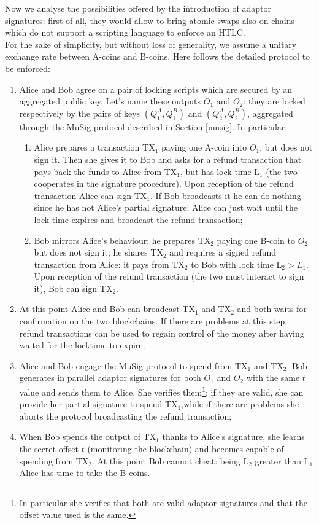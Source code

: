 \bigskip
\noindent
Now we analyse the possibilities offered by the introduction of adaptor signatures: first of all, they would allow to bring atomic swaps also on chains which do not support a scripting language to enforce an HTLC. 
\\
For the sake of simplicity, but without loss of generality, we assume a unitary exchange rate between A-coins and B-coins. Here follows the detailed protocol to be enforced:
\begin{enumerate}
	\item Alice and Bob agree on a pair of locking scripts which are secured by an aggregated public key. Let's name these outputs $O_1$ and $O_2$: they are locked respectively by the pairs of keys $(Q_1^A, Q_1^B)$ and $(Q_2^A, Q_2^B)$, aggregated through the MuSig protocol described in Section \ref{musig}. In particular:
	\begin{enumerate}
		\item Alice prepares a transaction TX$_1$ paying one A-coin into $O_1$, but does not sign it. Then she gives it to Bob and asks for a refund transaction that pays back the funds to Alice from TX$_1$, but has lock time L$_1$ (the two cooperates in the signature procedure). Upon reception of the refund transaction Alice can sign TX$_1$. If Bob broadcasts it he can do nothing since he has not Alice's partial signature; Alice can just wait until the lock time expires and broadcast the refund transaction;
		\item Bob mirrors Alice's behaviour: he prepares TX$_2$ paying one B-coin to $O_2$ but does not sign it; he shares TX$_2$ and requires a signed refund transaction from Alice: it pays from TX$_2$ to Bob with lock time L$_2 > L_1$. Upon reception of the refund transaction (the two must interact to sign it), Bob can sign TX$_2$.
	\end{enumerate}
	\item At this point Alice and Bob can broadcast TX$_1$ and TX$_2$ and both waits for confirmation on the two blockchains. If there are problems at this step, refund transactions can be used to regain control of the money after having waited for the locktime to expire;
	\item Alice and Bob engage the MuSig protocol to spend from TX$_1$ and TX$_2$. Bob generates in parallel adaptor signatures for both $O_1$ and $O_2$ with the same $t$ value and sends them to Alice. She verifies them\footnote{In particular she verifies that both are valid adaptor signatures and that the offset value used is the same.}: if they are valid, she can provide her partial signature to spend TX$_1$,while if there are problems she aborts the protocol broadcasting the refund transaction;
	\item When Bob spends the output of TX$_1$ thanks to Alice's signature, she learns the secret offset $t$ (monitoring the blockchain) and becomes capable of spending from TX$_2$. At this point Bob cannot cheat: being L$_2$ greater than L$_1$ Alice has time to take the B-coins.
\end{enumerate}

